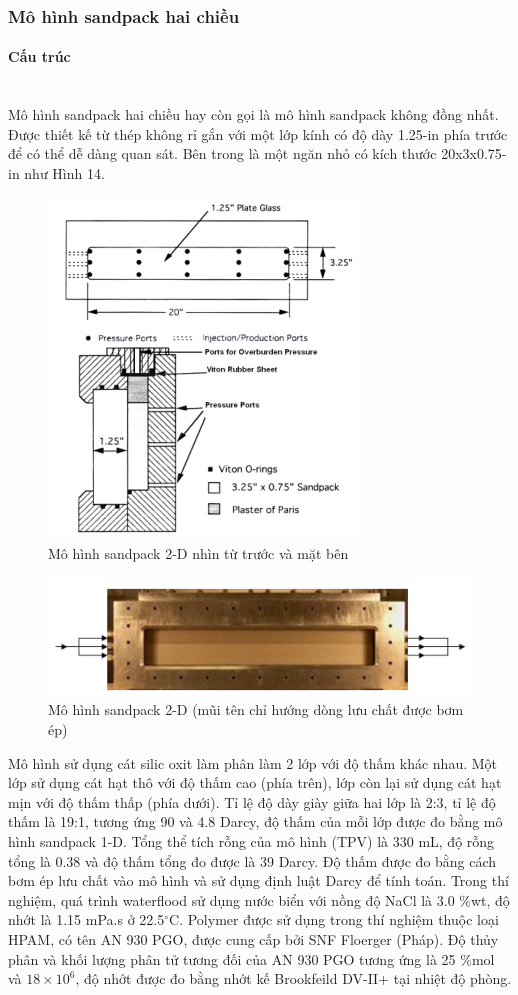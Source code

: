 \documentclass[12pt,a4paper]{article}
\newcommand{\subsubsubsection}[1]{\paragraph{#1}\mbox{}\\}
\begin{document}
	\subsubsection{Mô hình sandpack hai chiều}
	\subsubsubsection{Cấu trúc}
	Mô hình sandpack hai chiều hay còn gọi là mô hình sandpack không đồng nhất. Được thiết kế từ thép không rỉ gắn với một lớp kính có độ dày 1.25-in phía trước để có thể dễ dàng quan sát. Bên trong là một ngăn nhỏ có kích thước 20x3x0.75-in như Hình 14.
		\begin{figure}[h]
			\centering
			\includegraphics[scale=1]{Fig/2dsandpack1.PNG}
			\caption{Mô hình sandpack 2-D nhìn từ trước và mặt bên \cite{li2011study}}
		\end{figure}
		\begin{figure}[h]
			\centering
			\includegraphics[scale=1]{Fig/2dsandpack2.PNG}
			\caption{Mô hình sandpack 2-D (mũi tên chỉ hướng dòng lưu chất được bơm ép) \cite{li2011study}}
		\end{figure}
	\newline
	Mô hình sử dụng cát silic oxit làm phân làm 2 lớp với độ thấm khác nhau. Một lớp sử dụng cát hạt thô với độ thấm cao (phía trên), lớp còn lại sử dụng cát hạt mịn với độ thấm thấp (phía dưới). Tỉ lệ độ dày giày giữa hai lớp là 2:3, tỉ lệ độ thấm là 19:1, tương ứng 90 và 4.8 Darcy, độ thấm của mỗi lớp được đo bằng mô hình sandpack 1-D. Tổng thể tích rỗng của mô hình (TPV) là 330 mL, độ rỗng tổng là 0.38 và độ thấm tổng đo được là 39 Darcy. Độ thấm được đo bằng cách bơm ép lưu chất vào mô hình và sử dụng định luật Darcy để tính toán. Trong thí nghiệm, quá trình waterflood sử dụng nước biển với nồng độ NaCl là 3.0 \%wt, độ nhớt là 1.15 mPa.s ở 22.5$^{\circ}$C. Polymer được sử dụng trong thí nghiệm thuộc loại HPAM, có tên AN 930 PGO, được cung cấp bởi SNF Floerger (Pháp). Độ thủy phân và khối lượng phân tử tương đối của AN 930 PGO tương ứng là 25 \%mol và $18\times10^6$, độ nhớt được đo bằng nhớt kế Brookfeild DV-II+ tại nhiệt độ phòng.
\end{document}
